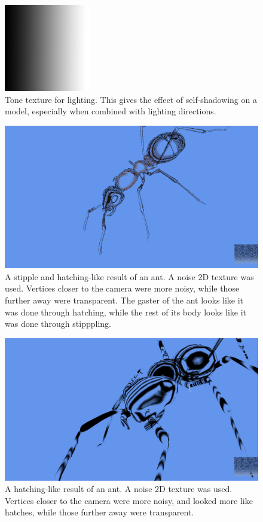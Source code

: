 \documentclass[annual]{acmsiggraph}
\begin{document}
\begin{figure}[h]
	\centering
	\includegraphics[width=1.5in]{images/xtoon_shading_gradient}
	\caption{Tone texture for lighting. This gives the effect of self-shadowing on a model, especially when combined with lighting directions.}
	\label{fig:gradient}
\end{figure}

\begin{figure}[h]
	\centering
	\includegraphics[width=5.5in]{images/stipple-hatch-result1}
	\caption{A stipple and hatching-like result of an ant. A noise 2D texture was used. Vertices closer to the camera were more noisy, while those further away were transparent. The gaster of the ant looks like it was done through hatching, while the rest of its body looks like it was done through stipppling.}
	\label{fig:stippleHatch1}
\end{figure}

\begin{figure}[h]
	\centering
	\includegraphics[width=5.5in]{images/stipple-hatch-result2}
	\caption{A hatching-like result of an ant. A noise 2D texture was used. Vertices closer to the camera were more noisy, and looked more like hatches, while those further away were transparent.}
	\label{fig:stippleHatch2}
\end{figure}
\end{document}
